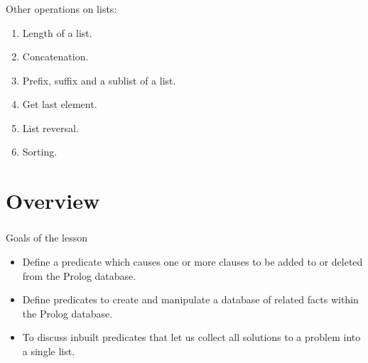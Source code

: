 

\begin{frame}
	\frametitle{\insertsection}
	
	Other operations on lists:
	
	\begin{enumerate}
		\item Length of a list.
		\item Concatenation.
		\item Prefix, suffix and a sublist of a list.
		\item Get last element.
		\item List reversal.
		\item Sorting.
	\end{enumerate}
\end{frame}



\section{Overview}

\begin{frame}
	\frametitle{\insertsection}
	Goals of the lesson
	\begin{itemize}
		\item Define a predicate which causes one or more clauses to be added to or deleted from the Prolog database.
		\item Define predicates to create and manipulate a database of related facts within the Prolog database.
		\item To discuss inbuilt predicates that let us collect all solutions to a problem into a single list.
	\end{itemize}
\end{frame}

